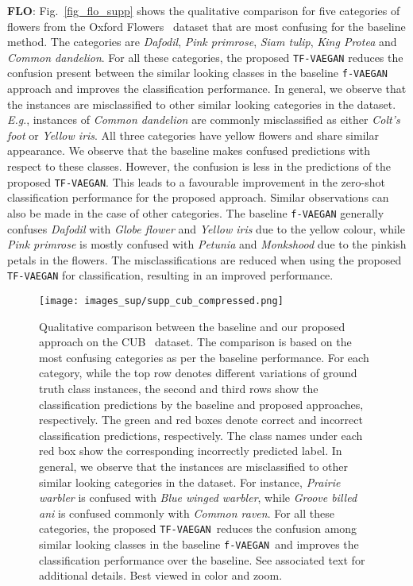 \documentclass[runningheads]{llncs}
\def\Eg{\emph{E.g}.}
\newcommand{\vaegan}{\texttt{f-VAEGAN}}
\newcommand{\proposed}{\texttt{TF-VAEGAN}}
\begin{document}
\noindent\textbf{FLO}: Fig.~\ref{fig_flo_supp} shows the qualitative comparison for five categories of flowers from the Oxford Flowers~\cite{flo} dataset that are most confusing for the baseline method. The categories are \textit{Dafodil}, \textit{Pink primrose}, \textit{Siam tulip}, \textit{King Protea} and \textit{Common dandelion}. For all these categories, the proposed \proposed{} reduces the confusion present between the similar looking classes in the baseline \vaegan{} approach and improves the classification performance. In general, we observe that the instances are misclassified to other similar looking categories in the dataset. \Eg, instances of \textit{Common dandelion} are commonly misclassified as either \textit{Colt's foot} or \textit{Yellow iris}. All three categories have yellow flowers and share similar appearance. We observe that the baseline makes confused predictions with respect to these classes. However, the confusion is less in the predictions of the proposed \proposed. This leads to a favourable improvement in the zero-shot classification performance for the proposed approach. Similar observations can also be made in the case of other categories. The baseline \vaegan{} generally confuses \textit{Dafodil} with \textit{Globe flower} and \textit{Yellow iris} due to the yellow colour, while \textit{Pink primrose} is mostly confused with \textit{Petunia} and \textit{Monkshood} due to the pinkish petals in the flowers. The misclassifications are reduced when using the proposed \proposed{} for classification, resulting in an improved performance.



\begin{figure}[t]
\centering
\texttt{[image: images\_sup/supp\_cub\_compressed.png]}
\caption{\label{fig_cub_supp}Qualitative comparison between the baseline and our proposed approach on the CUB~\cite{cub} dataset. The comparison is based on the most confusing categories as per the baseline performance. For each category, while the top row denotes different variations of ground truth class instances, the second and third rows show the classification predictions by the baseline and proposed approaches, respectively. The green and red boxes denote correct and incorrect classification predictions, respectively. The class names under each red box show the corresponding incorrectly predicted label. In general, we observe that the instances are misclassified to other similar looking categories in the dataset. For instance, \textit{Prairie warbler} is confused with \textit{Blue winged warbler}, while \textit{Groove billed ani} is confused commonly with \textit{Common raven}.  For all these categories, the proposed \proposed~reduces the confusion among similar looking classes in the baseline \vaegan~and improves the classification performance over the baseline. See associated text for additional details. Best viewed in color and zoom.}
\end{figure}
\end{document}
